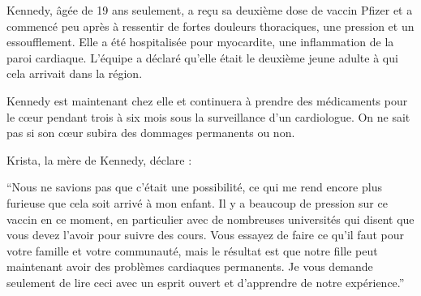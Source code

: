 Kennedy, âgée de 19 ans seulement, a reçu sa deuxième dose de vaccin Pfizer et a
commencé peu après à ressentir de fortes douleurs thoraciques, une pression et
un essoufflement. Elle a été hospitalisée pour myocardite, une inflammation de
la paroi cardiaque. L'équipe a déclaré qu'elle était le deuxième jeune adulte à
qui cela arrivait dans la région.

Kennedy est maintenant chez elle et continuera à prendre des médicaments pour le
cœur pendant trois à six mois sous la surveillance d'un cardiologue. On ne sait
pas si son cœur subira des dommages permanents ou non.

Krista, la mère de Kennedy, déclare :

“Nous ne savions pas que c'était une possibilité, ce qui me rend encore plus
furieuse que cela soit arrivé à mon enfant. Il y a beaucoup de pression sur ce
vaccin en ce moment, en particulier avec de nombreuses universités qui disent
que vous devez l'avoir pour suivre des cours. Vous essayez de faire ce qu'il
faut pour votre famille et votre communauté, mais le résultat est que notre
fille peut maintenant avoir des problèmes cardiaques permanents. Je vous demande
seulement de lire ceci avec un esprit ouvert et d'apprendre de notre
expérience.”

